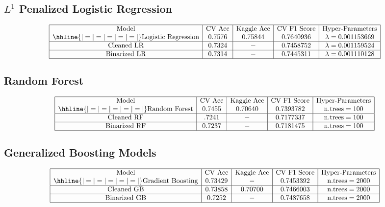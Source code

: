 \documentclass{article}
\begin{document}
\subsection{$L^1$ Penalized Logistic Regression}
$$\begin{array}{|c|c|c|c|c|}
\hline
\text{Model} & \text{CV Acc} & \text{Kaggle Acc} & \text{CV F1 Score} & \text{Hyper-Parameters} \\
\hhline{|=|=|=|=|=|}
\text{Logistic Regression} & 0.7576 & 0.75844 & 0.7640936 & \lambda = 0.001153669\\
\hline
\text{Cleaned LR} & 0.7324 & - & 0.7458752 & \lambda = 0.001159524 \\
\hline
\text{Binarized LR} & 0.7314 & - & 0.7445311 & \lambda = 0.001110128 \\
\hline
\end{array}$$

\subsection{Random Forest}
$$\begin{array}{|c|c|c|c|c|}
\hline
\text{Model} & \text{CV Acc} & \text{Kaggle Acc} & \text{CV F1 Score} & \text{Hyper-Parameters}   \\
\hhline{|=|=|=|=|=|}
\text{Random Forest} & 0.7455 & 0.70640 & 0.7393782 & \text{n.trees} = 100 \\
\hline
\text{Cleaned RF} & .7241 & - & 0.7177337 & \text{n.trees} = 100 \\
\hline
\text{Binarized RF} & 0.7237 & - & 0.7181475 & \text{n.trees} = 100 \\
\hline
\end{array}$$

\subsection{Generalized Boosting Models}
$$\begin{array}{|c|c|c|c|c|}
\hline
\text{Model} & \text{CV Acc} & \text{Kaggle Acc} & \text{CV F1 Score} & \text{Hyper-Parameters} \\
\hhline{|=|=|=|=|=|}
\text{Gradient Boosting} &0.73429  & - & 0.7453392 & \text{n.trees} = 2000 \\
\hline
\text{Cleaned GB} & 0.73858 & 0.70700 & 0.7466003 & \text{n.trees} = 2000 \\
\hline
\text{Binarized GB} & 0.7252 & - & 0.7487658 & \text{n.trees} = 2000 \\
\hline
\end{array}$$
\end{document}
